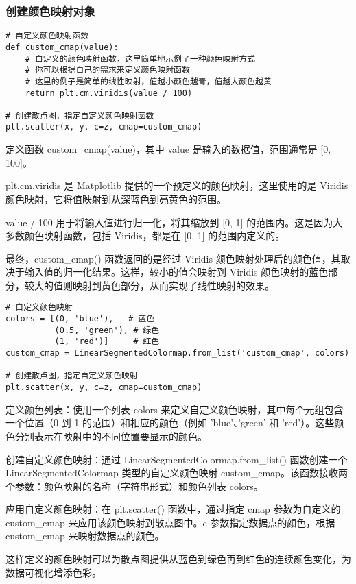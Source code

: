 \documentclass{article}
\begin{document}
\subsubsection{创建颜色映射对象}
\begin{lstlisting}[caption={示例Python代码}]
# 自定义颜色映射函数
def custom_cmap(value):
    # 自定义的颜色映射函数，这里简单地示例了一种颜色映射方式
    # 你可以根据自己的需求来定义颜色映射函数
    # 这里的例子是简单的线性映射，值越小颜色越青，值越大颜色越黄
    return plt.cm.viridis(value / 100)  

# 创建散点图，指定自定义颜色映射函数
plt.scatter(x, y, c=z, cmap=custom_cmap)
\end{lstlisting}
定义函数 custom\_cmap(value)，其中 value 是输入的数据值，范围通常是 [0, 100]。

plt.cm.viridis 是 Matplotlib 提供的一个预定义的颜色映射，这里使用的是 Viridis 颜色映射，它将值映射到从深蓝色到亮黄色的范围。

value / 100 用于将输入值进行归一化，将其缩放到 [0, 1] 的范围内。这是因为大多数颜色映射函数，包括 Viridis，都是在 [0, 1] 的范围内定义的。

最终，custom\_cmap() 函数返回的是经过 Viridis 颜色映射处理后的颜色值，其取决于输入值的归一化结果。这样，较小的值会映射到 Viridis 颜色映射的蓝色部分，较大的值则映射到黄色部分，从而实现了线性映射的效果。
\begin{lstlisting}[caption={示例Python代码}]
# 自定义颜色映射
colors = [(0, 'blue'),   # 蓝色
          (0.5, 'green'), # 绿色
          (1, 'red')]     # 红色
custom_cmap = LinearSegmentedColormap.from_list('custom_cmap', colors)

# 创建散点图，指定自定义颜色映射
plt.scatter(x, y, c=z, cmap=custom_cmap)
\end{lstlisting}
定义颜色列表：使用一个列表 colors 来定义自定义颜色映射，其中每个元组包含一个位置（0 到 1 的范围）和相应的颜色（例如 'blue'、'green' 和 'red'）。这些颜色分别表示在映射中的不同位置要显示的颜色。

创建自定义颜色映射：通过 LinearSegmentedColormap.from\_list() 函数创建一个 LinearSegmentedColormap 类型的自定义颜色映射 custom\_cmap。该函数接收两个参数：颜色映射的名称（字符串形式）和颜色列表 colors。

应用自定义颜色映射：在 plt.scatter() 函数中，通过指定 cmap 参数为自定义的 custom\_cmap 来应用该颜色映射到散点图中。c 参数指定数据点的颜色，根据 custom\_cmap 来映射数据点的颜色。

这样定义的颜色映射可以为散点图提供从蓝色到绿色再到红色的连续颜色变化，为数据可视化增添色彩。
\end{document}
